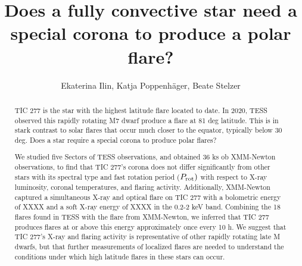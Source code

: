 \documentclass[twocolumn]{aastex631}
\begin{document}
\title{Does a fully convective star need a special corona to produce a polar flare?}

\author{Ekaterina Ilin, Katja Poppenh\"ager, Beate Stelzer}



\begin{abstract}
    TIC 277 is the star with the highest latitude flare located to date. In 2020, TESS observed this rapidly rotating M7 dwarf produce a flare at 81 deg latitude. This is in stark contrast to solar flares that occur much closer to the equator, typically below 30 deg. Does a star require a special corona to produce polar flares?

    We studied five Sectors of TESS observations, and obtained 36 ks ob XMM-Newton observations, to find that TIC 277's corona does not differ significantly from other stars with its spectral type and fast rotation period ($P_{\rm rot})$ with respect to X-ray luminosity, coronal temperatures, and flaring activity. Additionally, XMM-Newton captured a simultaneous X-ray and optical flare on TIC 277 with a bolometric energy of XXXX and a soft X-ray energy of XXXX in the 0.2-2 keV band. Combining the 18 flares found in TESS with the flare from XMM-Newton, we inferred that TIC 277 produces flares at or above this energy approximately once every 10 h. We suggest that TIC 277's X-ray and flaring activity is representative of other rapidly rotating late M dwarfs, but that further measurements of localized flares are needed to understand the conditions under which high latitude flares in these stars can occur.
    
    
\end{abstract}

\end{document}
